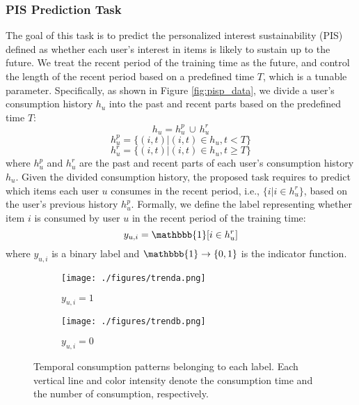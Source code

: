 \documentclass[sigconf]{acmart}
\begin{document}
\subsubsection{\textbf{PIS Prediction Task}}
The goal of this task is to predict the personalized interest sustainability (PIS) defined as whether each user's interest in items is likely to sustain up to the future. 
We treat the recent period of the training time as the future, and control the length of the recent period based on a predefined time $T$, which is a tunable parameter. 
Specifically, as shown in Figure \ref{fig:pisp_data}, we divide a user's consumption history $h_u$ into the past and recent parts based on the predefined time $T$:
\begin{equation*}
    h_u = h_u^p \, \cup  \, h_u^r 
\end{equation*}
\begin{equation*}
    h_u^p = \{(i,t)| (i,t) \in h_u, t < T\}
\end{equation*}
\begin{equation*}
    h_u^r = \{(i,t)| (i,t) \in h_u, t \geq T\}
\end{equation*}
where $h_u^p$ and $h_u^r$ are the past and recent parts of each user's consumption history $h_u$.
Given the divided consumption history, the proposed task requires to predict which items each user $u$ consumes in the recent period, i.e., $\{i| i \in h_u^r\}$, based on the user's previous history $h_u^p$.
Formally, we define the label representing whether item $i$ is consumed by user $u$ in the recent period of the training time: 
\begin{equation}
    y_{u,i} = \mathbbb{1}[i \in h_u^r]
    \label{eqn:label}
\end{equation}
where $y_{u,i}$ is a binary label and $\mathbbb{1} \rightarrow{\{0, 1\}}$ is the indicator function.

\begin{figure}[t]
    \centering
    \begin{subfigure}[b]{0.6\linewidth}
         \centering
         \texttt{[image: ./figures/trenda.png]}
         \caption{$y_{u,i}=1$}
         \label{fig:pattern1}
     \end{subfigure}
     
     \begin{subfigure}[b]{0.6\linewidth}
         \centering
         \texttt{[image: ./figures/trendb.png]}
         \caption{$y_{u,i}=0$}
         \label{fig:pattern0}
     \end{subfigure}
     \caption{Temporal consumption patterns belonging to each label. Each vertical line and color intensity denote the consumption time and the number of consumption, respectively.}
     \label{fig:pattern}
\end{figure}
\end{document}
